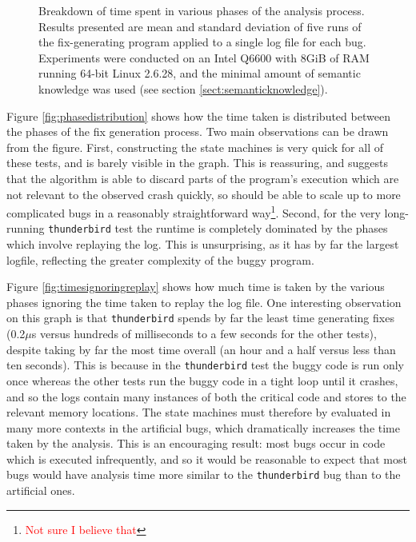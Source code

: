 \documentclass[10pt,twocolumn,preprint,natbib,authoryear]{sigplanconf}
\newcommand{\editorial}[1]{\textcolor{red}{\footnote{\textcolor{red}{#1}}}}
\begin{document}
\begin{figure*}
\hspace{10mm} 
\caption{Breakdown of time spent in various phases of the analysis
  process.  Results presented are mean and standard deviation of five
  runs of the fix-generating program applied to a single log file for
  each bug.  Experiments were conducted on an Intel Q6600 with 8GiB of
  RAM running 64-bit Linux 2.6.28, and the minimal amount of semantic
  knowledge was used (see section \ref{sect:semanticknowledge}).}
\end{figure*}

Figure \ref{fig:phasedistribution} shows how the time taken is
distributed between the phases of the fix generation process.  Two
main observations can be drawn from the figure.  First, constructing
the state machines is very quick for all of these tests, and is barely
visible in the graph.  This is reassuring, and suggests that the
algorithm is able to discard parts of the program's execution which
are not relevant to the observed crash quickly, so should be able to
scale up to more complicated bugs in a reasonably straightforward
way\editorial{Not sure I believe that}.  Second, for the very
long-running \verb|thunderbird| test the runtime is completely
dominated by the phases which involve replaying the log.  This is
unsurprising, as it has by far the largest logfile, reflecting the
greater complexity of the buggy program.

Figure \ref{fig:timesignoringreplay} shows how much time is taken by
the various phases ignoring the time taken to replay the log file.
One interesting observation on this graph is that \verb|thunderbird|
spends by far the least time generating fixes (0.2$\mu{}$s versus
hundreds of milliseconds to a few seconds for the other tests),
despite taking by far the most time overall (an hour and a half versus
less than ten seconds).  This is because in the \verb|thunderbird|
test the buggy code is run only once whereas the other tests run the
buggy code in a tight loop until it crashes, and so the logs contain
many instances of both the critical code and stores to the relevant
memory locations.  The state machines must therefore by evaluated in
many more contexts in the artificial bugs, which dramatically
increases the time taken by the analysis.  This is an encouraging
result: most bugs occur in code which is executed infrequently, and so
it would be reasonable to expect that most bugs would have analysis
time more similar to the \verb|thunderbird| bug than to the artificial
ones.
\end{document}
